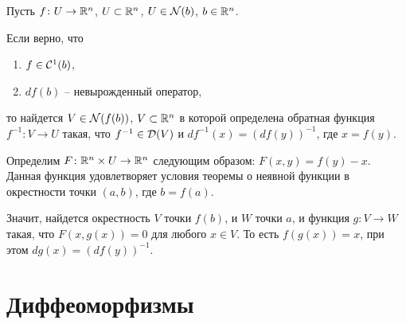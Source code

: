 	\begin{corollary}
		Пусть $f\colon U \to \mathbb{R}^n$, $U\subset \mathbb{R}^n$, $U \in \mathcal{N} (b)$, $b\in \mathbb{R}^n$. 
		
		Если верно, что 
		\begin{enumerate}
			\item $f\in \mathcal{C}^1(b)$,
			\item $df(b)$ -- невырожденный оператор,
		\end{enumerate}
		то найдется $V\in \mathcal{N}(f(b))$, $V \subset \mathbb{R}^n$ в которой определена обратная функция $f^{-1}\colon V \to U$ такая, что $f^{-1}\in \mathcal{D}(V)$ и $df^{-1}(x) = (df(y))^{-1}$, где $x=f(y)$.
	\end{corollary}
	\begin{Proof}
		Определим $F\colon \mathbb{R}^n \times U \to \mathbb{R}^n$ следующим образом: $F(x, y) = f(y) - x$. 
		Данная функция удовлетворяет условия теоремы о неявной функции в окрестности точки $(a,b)$, где $b=f(a)$. 
		
		Значит, найдется окрестность $V$ точки $f(b)$, и $W$ точки $a$, и  функция $g\colon V \to W$ такая, что $F(x, g(x)) = 0$ для любого $x\in V$. То есть $f(g(x)) = x$, при этом $dg(x) = (df(y))^{-1}$.
	\end{Proof}
	
	\section{Диффеоморфизмы}
	
